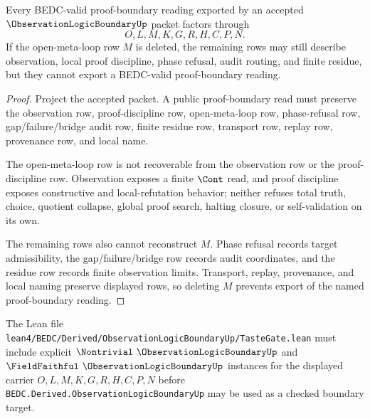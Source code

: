 \begin{theorem}
\label{thm:observation-logic-boundary-nonescape}
Every BEDC-valid proof-boundary reading exported by an accepted $\ObservationLogicBoundaryUp$ packet factors through
$$
O,L,M,K,G,R,H,C,P,N.
$$
If the open-meta-loop row $M$ is deleted, the remaining rows may still describe observation, local proof discipline, phase refusal, audit routing, and finite residue, but they cannot export a BEDC-valid proof-boundary reading.
\end{theorem}
\begin{proof}
Project the accepted packet. A public proof-boundary read must preserve the observation row, proof-discipline row, open-meta-loop row, phase-refusal row, gap/failure/bridge audit row, finite residue row, transport row, replay row, provenance row, and local name.

The open-meta-loop row is not recoverable from the observation row or the proof-discipline row. Observation exposes a finite $\Cont$ read, and proof discipline exposes constructive and local-refutation behavior; neither refuses total truth, choice, quotient collapse, global proof search, halting closure, or self-validation on its own.

The remaining rows also cannot reconstruct $M$. Phase refusal records target admissibility, the gap/failure/bridge row records audit coordinates, and the residue row records finite observation limits. Transport, replay, provenance, and local naming preserve displayed rows, so deleting $M$ prevents export of the named proof-boundary reading.
\end{proof}



The Lean file \texttt{lean4/BEDC/Derived/ObservationLogicBoundaryUp/TasteGate.lean} must include explicit $\Nontrivial\ \ObservationLogicBoundaryUp$ and $\FieldFaithful\ \ObservationLogicBoundaryUp$ instances for the displayed carrier $O,L,M,K,G,R,H,C,P,N$ before \texttt{BEDC.Derived.ObservationLogicBoundaryUp} may be used as a checked boundary target.

